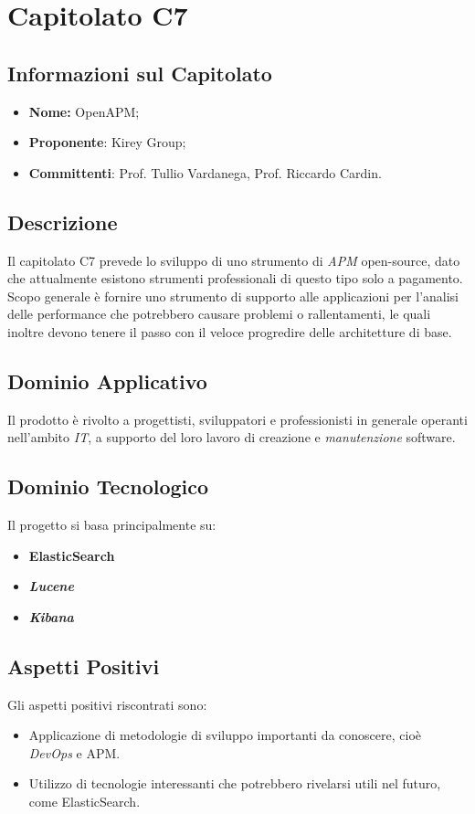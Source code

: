 \section{Capitolato C7}
\subsection{Informazioni sul Capitolato}
	\begin{itemize}
		\item \textbf{Nome:}
		OpenAPM;
		\item \textbf{Proponente}:
		Kirey Group;
		\item \textbf{Committenti}:
		Prof. Tullio Vardanega, Prof. Riccardo Cardin.
	\end{itemize}

\subsection{Descrizione}
	Il capitolato C7 prevede lo sviluppo di uno strumento di \textit{APM} open-source, dato che attualmente esistono strumenti professionali di questo tipo solo a pagamento. Scopo generale è fornire uno strumento di supporto alle applicazioni per l'analisi delle performance che potrebbero causare problemi o rallentamenti, le quali inoltre devono tenere il passo con il veloce progredire delle architetture di base.
		
\subsection{Dominio Applicativo}
	Il prodotto è rivolto a progettisti, sviluppatori e professionisti in generale operanti nell'ambito \textit{IT}, a supporto del loro lavoro di creazione e \textit{manutenzione} software. 

\subsection{Dominio Tecnologico}
	Il progetto si basa principalmente su:
		\begin{itemize}
			\item \textbf{ElasticSearch}
			\item \textit{\textbf{Lucene}}
			\item \textit{\textbf{Kibana}}
		\end{itemize}

\subsection{Aspetti Positivi}
	Gli aspetti positivi riscontrati sono:
	\begin{itemize}
	\item Applicazione di metodologie di sviluppo importanti da conoscere, cioè \textit{DevOps} e APM.
	\item Utilizzo di tecnologie interessanti che potrebbero rivelarsi utili nel futuro, come ElasticSearch.
	\end{itemize}

